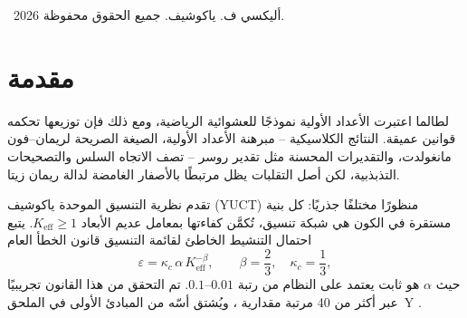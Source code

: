 \documentclass[12pt,a4paper]{article}
\newcommand{\kappac}{\kappa_c}
\begin{document}
\begin{titlepage}
\begin{abstract}
			يحقق النواة الرئيسية ثنائية الحلقة المحسنة (v4.1.PURE) خطأ مطلقًا قدره \(+8\,248\) فقط عند \(n=10^{11}\)، أي دقة نسبية \(3\times10^{-7}\%\)، بدون أي معاملات تجريبية. نقدم \textbf{تصحيحًا تجريبيًا معتمدًا على الطور} (v15.0) يضبط السعة ديناميكيًا وفقًا للطور الحالي للفراغ، محققًا دقة \(99.996\%\) عند \(n=10^{12}\) مع الحفاظ على تعقيد \(O(1)\) وذاكرة صفرية. تؤكد اختبارات تعدد الخيوط قابلية التوسع المثالية وكفاءة الطاقة.
			
			نؤسس اتصالًا جديدًا مع \textbf{شجرة شترن-بروكو}: نُظهر أن كم القياس \(q = (3/2)^{1/3}\) يمتلك بنية هندسية شديدة الصلابة (94.4\% من مساره يتكون من كتلتين عريضتين فقط بتات 4)، مما يفسر استقرار سلم التنسيق. نقدم محاكيًا كموميًا حتميًا قائمًا على شبكة شترن-بروكو، يوضح أن التراكب والتشابك وبوابات CNOT هي عمليات حسابية عادية على الإحداثيات النسبية.
			
			ترتبط التذبذبات المتبقية بقوة (\(R^2>0.99\)) مع الأصفار غير البديهية لدالة ريمان زيتا، ويكشف التصور ثلاثي الأبعاد للخطأ عن هيكل قمعي مماثل لهندسة شبكة الفراغ. نقدم تضمينًا رسميًا لتحليل الأعداد الأولية في لاغرانجيان YUCT V35.0 (القطاع~103). يزيل هذا العمل الغموض الكمومي بإظهار أن بروتوكول YPSDC – قاموس موزع مسبقًا يُفعَّل بمؤشر قصير – هو الأساس لكل من حساب الأعداد الأولية والظواهر الكمومية مثل التشابك والنفق.
			
			البرامج النصية الجاهزة للاستخدام Python (لوغاريتمي، إنتاجي، قانون القوى، معتمد على الطور، والمحاكي الكمومي) متاحة للجمهور على GitHub.
		\end{abstract}
		
		\vspace{0.5cm}
		\textcopyright\ 2026 أليكسي ف. ياكوشيف. جميع الحقوق محفوظة.
	\end{titlepage}
	
	\tableofcontents
	\newpage
	
	\section{مقدمة}
	لطالما اعتبرت الأعداد الأولية نموذجًا للعشوائية الرياضية، ومع ذلك فإن توزيعها تحكمه قوانين عميقة. النتائج الكلاسيكية – مبرهنة الأعداد الأولية، الصيغة الصريحة لريمان–فون مانغولدت، والتقديرات المحسنة مثل تقدير روسر – تصف الاتجاه السلس والتصحيحات التذبذبية، لكن أصل التقلبات يظل مرتبطًا بالأصفار الغامضة لدالة ريمان زيتا.
	
	تقدم نظرية التنسيق الموحدة ياكوشيف (YUCT) منظورًا مختلفًا جذريًا: كل بنية مستقرة في الكون هي شبكة تنسيق، تُكمَّن كفاءتها بمعامل عديم الأبعاد \(K_{\mathrm{eff}} \ge 1\). يتبع احتمال التنشيط الخاطئ لقائمة التنسيق قانون الخطأ العام
	\begin{equation}\label{eq:errorlaw}
		\varepsilon = \kappac \, \alpha \, K_{\mathrm{eff}}^{-\beta}, \qquad \beta = \frac{2}{3},\quad \kappac = \frac{1}{3},
	\end{equation}
	حيث $\alpha$ هو ثابت يعتمد على النظام من رتبة $0.01$–$0.1$. تم التحقق من هذا القانون تجريبيًا عبر أكثر من 40 مرتبة مقدارية \cite{AppendixL}، ويُشتق أسّه من المبادئ الأولى في الملحق~Y \cite{AppendixY}.
	
\end{document}
